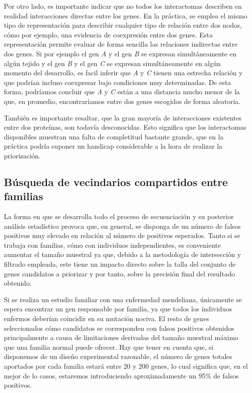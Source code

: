 \medskip
Por otro lado, es importante indicar que no todos los interactomas describen en realidad interacciones directas entre los genes. En la práctica, se emplea el mismo tipo de representación para describir cualquier tipo de relación entre dos nodos, cómo por ejemplo, una evidencia de coexpresión entre dos genes. Esta representación permite evaluar de forma sencilla las relaciones indirectas entre dos genes. Si por ejemplo el gen \emph{A} y el gen \emph{B} se expresan simultáneamente en algún tejido y el gen \emph{B} y el gen \emph{C} se expresan simultáneamente en algún momento del desarrollo, es facil inferir que \emph{A} y \emph{C} tienen una estrecha relación y que podrían incluso coexpresar bajo condiciones muy determinadas. De esta forma, podríamos concluir que \emph{A} y \emph{C} están a una distancia mucho menor de la que, en promedio, encontraríamos entre dos genes escogidos de forma aleatoria.
 
\medskip
También es importante resaltar, que la gran mayoría de interacciones existentes entre dos proteínas, son todavía desconocidas. Esto significa que los interactomas disponibles muestran una falta de completitud bastante grande, que en la práctica podría suponer un handicap considerable a la hora de realizar la priorización. 
 
\subsection{Búsqueda de vecindarios compartidos entre familias}

La forma en que se desarrolla todo el proceso de secuenciación y su posterior análisis estadístico provoca que, en general, se disponga de un número de falsos positivos muy elevado en relación al número de positivos esperados. Tanto si se trabaja con familias, cómo con individuos independientes, es conveniente aumentar el tamaño muestral ya que, debido a la metodología de intersección y filtrado empleada, este tiene un impacto directo sobre la talla del conjunto de genes candidatos a priorizar y por tanto, sobre la precisión final del resultado obtenido.

\medskip
Si se realiza un estudio familiar con una enfermedad mendeliana, únicamente se espera encontrar un gen responsable por familia, ya que todos los individuos enfermos deberían coincidir en su mutación nociva. El resto de genes seleccionados cómo candidatos se corresponden con falsos positivos obtenidos principalmente a causa de limitaciones derivadas del tamaño muestral máximo que una familia normal puede ofrecer. Hay que tener en cuenta que, si disponemos de un diseño experimental razonable, el número de genes totales aportados por cada familia estará entre 20 y 200 genes, lo cual significa que, en el mejor de lo casos, estaremos introduciendo aproximadamente un 95\% de falsos positivos. 

